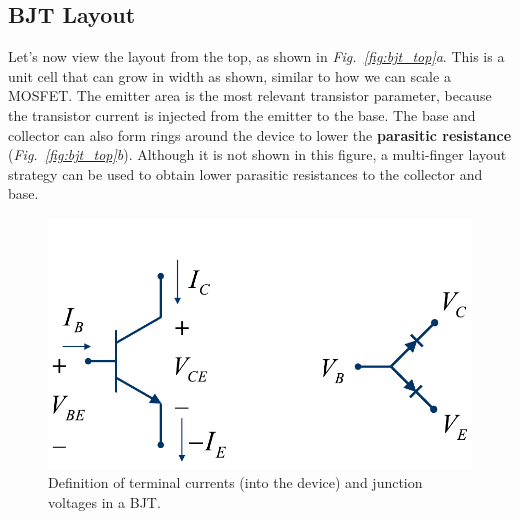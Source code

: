 \subsection{BJT Layout}
Let's now view the layout from the top, as shown in \emph{Fig.~\ref{fig:bjt_top}a}.  This is a unit cell that can grow in width as shown, similar to how we can scale a MOSFET.  The emitter area is the most relevant transistor parameter, because the transistor current is injected from the emitter to the base.  The base and collector can also form rings around the device to lower the \textbf{parasitic resistance} (\emph{Fig.~\ref{fig:bjt_top}b}).  Although it is not shown in this figure, a multi-finger layout strategy can be used to obtain lower parasitic resistances to the collector and base.
\newpage
\begin{figure}[t]
\centering
\includegraphics[width=.9\columnwidth]{slide5_bjt_schematic}
\caption{Definition of terminal currents (into the device) and junction voltages in a BJT.} \label{fig:slide5_bjt_schematic}
\end{figure}
